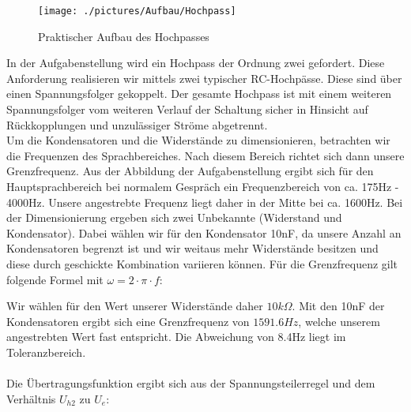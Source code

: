 \begin{figure}[htb]
    \texttt{[image: ./pictures/Aufbau/Hochpass]}
    \caption{Praktischer Aufbau des Hochpasses}
    \label{fig:HochpassPraktisch}
\end{figure}

In der Aufgabenstellung wird ein Hochpass der Ordnung zwei gefordert. Diese Anforderung realisieren wir mittels zwei typischer RC-Hochpässe. Diese sind über einen Spannungsfolger gekoppelt. Der gesamte Hochpass ist mit einem weiteren Spannungsfolger vom weiteren Verlauf der Schaltung sicher in Hinsicht auf Rückkopplungen und unzulässiger Ströme abgetrennt.
\\
Um die Kondensatoren und die Widerstände zu dimensionieren, betrachten wir die Frequenzen des Sprachbereiches. Nach diesem Bereich richtet sich dann unsere Grenzfrequenz. Aus der Abbildung der Aufgabenstellung ergibt sich für den Hauptsprachbereich bei normalem Gespräch ein Frequenzbereich von ca. 175Hz - 4000Hz. Unsere angestrebte Frequenz liegt daher in der Mitte bei ca. 1600Hz. Bei der Dimensionierung ergeben sich zwei Unbekannte (Widerstand und Kondensator). Dabei wählen wir für den Kondensator 10nF, da unsere Anzahl an Kondensatoren begrenzt ist und wir weitaus mehr Widerstände besitzen und diese durch geschickte Kombination variieren können. Für die Grenzfrequenz gilt folgende Formel mit $\omega = 2\cdot \pi \cdot f$: 


Wir wählen für den Wert unserer Widerstände daher $10k\Omega$. Mit den 10nF der Kondensatoren ergibt sich eine Grenzfrequenz von $1591.6Hz$, welche unserem angestrebten Wert fast entspricht. Die Abweichung von 8.4Hz liegt im Toleranzbereich.
\\
\\
Die Übertragungsfunktion ergibt sich aus der Spannungsteilerregel und dem Verhältnis $U_{h2}$ zu $U_{e}$:

